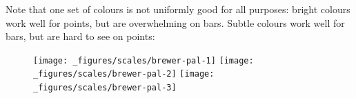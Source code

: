 Note that one set of colours is not uniformly good for all purposes:
bright colours work well for points, but are overwhelming on bars.
Subtle colours work well for bars, but are hard to see on points:

\begin{Shaded}
\begin{Highlighting}[]
\StringTok{ }\NormalTok{(} \NormalTok{:} \NormalTok{+}\StringTok{ }\NormalTok{(}\NormalTok{), } \NormalTok{(}\NormalTok{), } \NormalTok{(}\NormalTok{, }\NormalTok{, }\NormalTok{))}
\StringTok{ }
\StringTok{  }\NormalTok{(}\NormalTok{(} \StringTok{ }
\StringTok{  }\NormalTok{(} \NormalTok{) +}
\StringTok{  }\NormalTok{(} \NormalTok{, } \NormalTok{)}
\StringTok{ }\NormalTok{(} \NormalTok{)}
\StringTok{ }\NormalTok{(} \NormalTok{)  }
\StringTok{ }\NormalTok{(} \NormalTok{)}
\end{Highlighting}
\end{Shaded}

\begin{figure}[H]
  \texttt{[image: \_figures/scales/brewer-pal-1]}%
  \texttt{[image: \_figures/scales/brewer-pal-2]}%
  \texttt{[image: \_figures/scales/brewer-pal-3]}
\end{figure}

